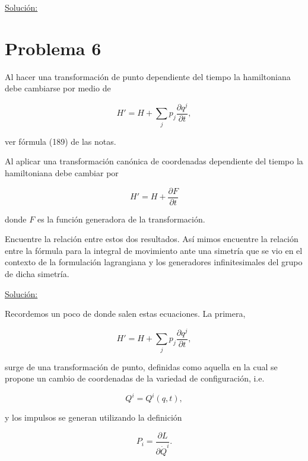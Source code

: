 \documentclass[a4paper,10pt]{article}
\numberwithin{equation}{section}
\begin{document}
\vspace{.3cm}

\underline{Solución:} \vspace{.3cm}

\section{Problema 6}

Al hacer una transformación de punto dependiente del tiempo la hamiltoniana 
debe cambiarse por medio de 

$$
H' = H + \sum_j p_j \frac{\partial q^j}{\partial t},
$$

ver fórmula (189) de las notas.

\vspace{.3cm}

Al aplicar una transformación canónica de coordenadas dependiente del tiempo la 
hamiltoniana debe cambiar por 

$$
H' = H + \frac{\partial F}{\partial t}
$$

donde $F$ es la función generadora de la transformación. 

\vspace{.3cm}

Encuentre la relación entre estos dos resultados. Así mimos encuentre la relación 
entre la fórmula para la integral de movimiento ante una simetría que se vio en el 
contexto de la formulación lagrangiana y los generadores infinitesimales del grupo 
de dicha simetría.

\vspace{.3cm}

\underline{Solución:} \vspace{.3cm}

Recordemos un poco de donde salen estas ecuaciones. La primera,

\begin{equation} 
H' = H + \sum_j p_j \frac{\partial q^j}{\partial t},
\label{eq:hamiltonianaPunto}
\end{equation}

surge de una transformación de punto, definidas como aquella en la cual se propone 
un cambio de coordenadas de la variedad de configuración, i.e. 

\begin{equation}
 Q^i = Q^i(q,t),
\end{equation}

y los impulsos se generan utilizando la definición 

\begin{equation}
P_i = \frac{\partial L}{\partial \dot{Q}^i}.
\end{equation}
\end{document}
